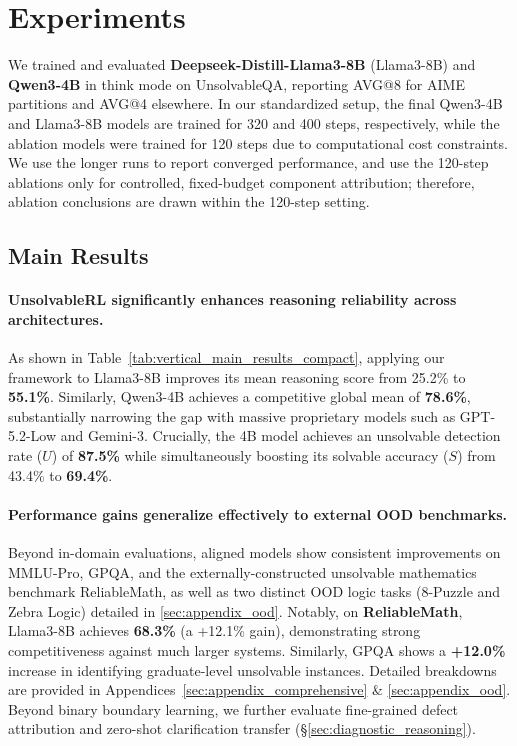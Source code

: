 \section{Experiments}
\label{sec:results}

We trained and evaluated \textbf{Deepseek-Distill-Llama3-8B} (Llama3-8B) \citep{grattafiori2024llama, guo2025deepseek} and \textbf{Qwen3-4B} \citep{yang2025qwen3technicalreport} in think mode on UnsolvableQA, reporting AVG@8 for AIME partitions and AVG@4 elsewhere. In our standardized setup, the final Qwen3-4B and Llama3-8B models are trained for 320 and 400 steps, respectively, while the ablation models were trained for 120 steps due to computational cost constraints. We use the longer runs to report converged performance, and use the 120-step ablations only for controlled, fixed-budget component attribution; therefore, ablation conclusions are drawn within the 120-step setting.


\subsection{Main Results}
\label{main_exp_}

\paragraph{UnsolvableRL significantly enhances reasoning reliability across architectures.} 
As shown in Table~\ref{tab:vertical_main_results_compact}, applying our framework to Llama3-8B improves its mean reasoning score from 25.2\% to \textbf{55.1\%}. Similarly, Qwen3-4B achieves a competitive global mean of \textbf{78.6\%}, substantially narrowing the gap with massive proprietary models such as GPT-5.2-Low and Gemini-3. Crucially, the 4B model achieves an unsolvable detection rate ($U$) of \textbf{87.5\%} while simultaneously boosting its solvable accuracy ($S$) from 43.4\% to \textbf{69.4\%}.

\paragraph{Performance gains generalize effectively to external OOD benchmarks.}
Beyond in-domain evaluations, aligned models show consistent improvements on MMLU-Pro, GPQA, and the externally-constructed unsolvable mathematics benchmark ReliableMath, as well as two distinct OOD logic tasks (8-Puzzle and Zebra Logic) detailed in \ref{sec:appendix_ood}. Notably, on \textbf{ReliableMath}, Llama3-8B achieves \textbf{68.3\%} (a +12.1\% gain), demonstrating strong competitiveness against much larger systems. Similarly, GPQA shows a \textbf{+12.0\%} increase in identifying graduate-level unsolvable instances. Detailed breakdowns are provided in Appendices~\ref{sec:appendix_comprehensive} \& \ref{sec:appendix_ood}. Beyond binary boundary learning, we further evaluate fine-grained defect attribution and zero-shot clarification transfer (\S\ref{sec:diagnostic_reasoning}).


